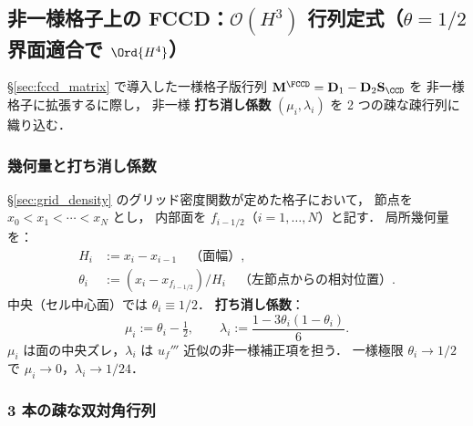%
%
\subsection{非一様格子上の FCCD：\texorpdfstring{$\mathcal{O}(H^3)$}{O(H3)} 行列定式（\texorpdfstring{$\theta=1/2$}{θ=1/2} 界面適合で \texorpdfstring{$\Ord{H^4}$}{O(H4)}）}
\label{sec:fccd_nonuniform}

\S\ref{sec:fccd_matrix} で導入した一様格子版行列
$\mathbf{M}^{\FCCD} = \mathbf{D}_1 - \mathbf{D}_2\mathbf{S}_{\CCD}$ を
非一様格子に拡張するに際し，
非一様 \textbf{打ち消し係数} $(\mu_i,\lambda_i)$ を
2 つの疎な疎行列に織り込む．

\subsubsection{幾何量と打ち消し係数}
\label{sec:fccd_nu_geometry}

\S\ref{sec:grid_density} のグリッド密度関数が定めた格子において，
節点を $x_0 < x_1 < \cdots < x_N$ とし，
内部面を $f_{i-1/2}$（$i=1,\ldots,N$）と記す．
局所幾何量を：
\begin{align}
  H_i &:= x_i - x_{i-1} \quad\text{（面幅）}, \label{eq:fccd_nu_Hi}\\
  \theta_i &:= (x_i - x_{f_{i-1/2}})/H_i \quad\text{（左節点からの相対位置）}. \label{eq:fccd_nu_theta}
\end{align}
中央（セル中心面）では $\theta_i \equiv 1/2$．
\textbf{打ち消し係数}：
\begin{equation}
  \mu_i := \theta_i - \tfrac{1}{2},
  \qquad
  \lambda_i := \frac{1 - 3\theta_i(1-\theta_i)}{6}.
  \label{eq:fccd_nu_mulambda}
\end{equation}
$\mu_i$ は面の中央ズレ，$\lambda_i$ は $u_f'''$ 近似の非一様補正項を担う．
一様極限 $\theta_i\to 1/2$ で $\mu_i\to 0$，$\lambda_i\to 1/24$．

\subsubsection{3 本の疎な双対角行列}
\label{sec:fccd_nu_matrices}

